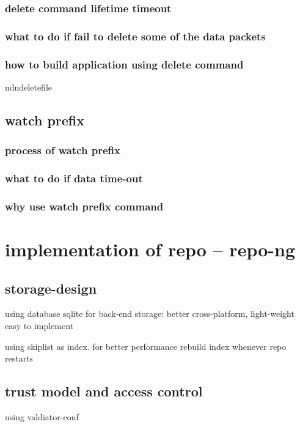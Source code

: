 \documentclass[conference]{IEEEtran}
\begin{document}
\subsubsection{delete command lifetime timeout}

\subsubsection{what to do if fail to delete some of the data packets}

\subsubsection{how to build application using delete command}
ndndeletefile

\subsection{watch prefix}

\subsubsection{process of watch prefix}

\subsubsection{what to do if data time-out}

\subsubsection{why use watch prefix command}

\section{implementation of repo -- repo-ng} \label{section-implementation}
\subsection{storage-design}
using database sqlite for back-end storage: better cross-platform, light-weight easy to implement

using skiplist as index. for better performance rebuild index whenever repo restarts

\subsection{trust model and access control}
using valdiator-conf
\end{document}

